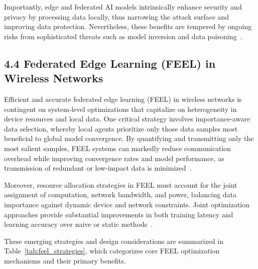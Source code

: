 \documentclass[11pt]{article}
\begin{document}
Importantly, edge and federated AI models intrinsically enhance security and privacy by processing data locally, thus narrowing the attack surface and improving data protection. Nevertheless, these benefits are tempered by ongoing risks from sophisticated threats such as model inversion and data poisoning~\cite{ref17,ref19,ref23,ref24}.

\subsection{4.4 Federated Edge Learning (FEEL) in Wireless Networks}

Efficient and accurate federated edge learning (FEEL) in wireless networks is contingent on system-level optimizations that capitalize on heterogeneity in device resources and local data. One critical strategy involves importance-aware data selection, whereby local agents prioritize only those data samples most beneficial to global model convergence. By quantifying and transmitting only the most salient samples, FEEL systems can markedly reduce communication overhead while improving convergence rates and model performance, as transmission of redundant or low-impact data is minimized~\cite{ref42}. 

Moreover, resource allocation strategies in FEEL must account for the joint assignment of computation, network bandwidth, and power, balancing data importance against dynamic device and network constraints. Joint optimization approaches provide substantial improvements in both training latency and learning accuracy over naive or static methods~\cite{ref42}. 

These emerging strategies and design considerations are summarized in Table~\ref{tab:feel_strategies}, which categorizes core FEEL optimization mechanisms and their primary benefits.
\end{document}

